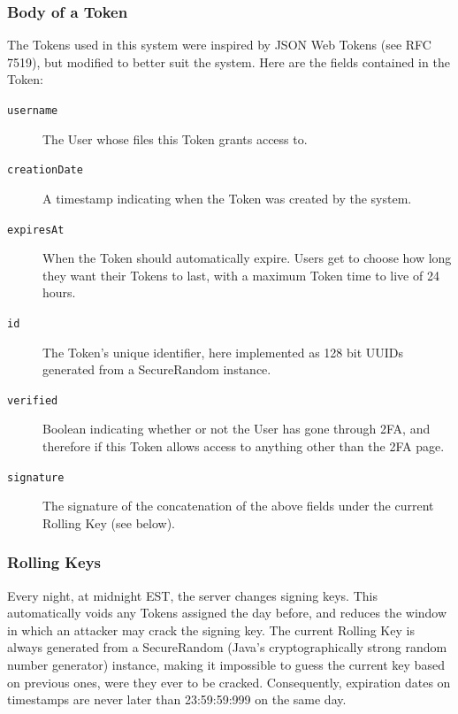 \documentclass{article}
\begin{document}
\subsubsection{Body of a Token}
\label{ssub:body_of_a_token}
\par The Tokens used in this system were inspired by JSON Web Tokens (see RFC 7519\cite{bib:RFC7519}), but modified to better suit the system. Here are the fields contained in the Token:
\begin{description}
  \item[\texttt{username}] The User whose files this Token grants access to.
  \item[\texttt{creationDate}] A timestamp indicating when the Token was created by the system.
  \item[\texttt{expiresAt}] When the Token should automatically expire. Users get to choose how long they want their Tokens to last, with a maximum Token time to live of 24 hours.
  \item[\texttt{id}] The Token's unique identifier, here implemented as 128 bit UUIDs generated from a SecureRandom instance.
  \item[\texttt{verified}] Boolean indicating whether or not the User has gone through 2FA, and therefore if this Token allows access to anything other than the 2FA page.
  \item[\texttt{signature}] The signature of the concatenation of the above fields under the current Rolling Key (see below).
\end{description}

\subsubsection{Rolling Keys}
\label{ssub:rolling_keys}
\par Every night, at midnight EST, the server changes signing keys. This automatically voids any Tokens assigned the day before, and reduces the window in which an attacker may crack the signing key. The current Rolling Key is always generated from a SecureRandom (Java's cryptographically strong random number generator) instance, making it impossible to guess the current key based on previous ones, were they ever to be cracked. Consequently, expiration dates on timestamps are never later than 23:59:59:999 on the same day.
\end{document}
